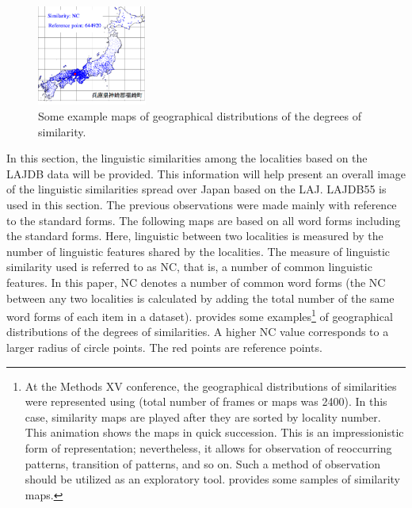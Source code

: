 \documentclass[output=paper]{LSP/langsci}
\begin{document}
\begin{figure}[b]
\includegraphics[width=0.32\textwidth]{illustrations/kuma_fig20-6}
\caption{Some example maps of geographical distributions of the degrees of similarity.}          
\label{fig:kuma:20}
\end{figure}
In this section, the linguistic similarities among the localities based on the LAJDB data will be provided. This information will help present an overall image of the linguistic similarities spread over Japan based on the LAJ. LAJDB55 is used in this section. The previous observations were made mainly with reference to the standard forms. The following maps are based on all word forms including the standard forms. Here, linguistic  between two localities is measured by the number of linguistic features shared by the localities. The measure of linguistic similarity used is referred to as NC, that is, a number of common linguistic features. In this paper, NC denotes a number of common word forms (the NC between any two localities is calculated by adding the total number of the same word forms of each item in a dataset).  provides some examples\footnote{At the Methods XV conference, the geographical distributions of similarities were represented using  (total number of frames or maps was 2400). In this case, similarity maps are played after they are sorted by locality number. This animation shows the maps in quick succession. This is an impressionistic form of representation; nevertheless, it allows for observation of reoccurring patterns, transition of patterns, and so on. Such a method of observation should be utilized as an exploratory tool.  provides some samples of similarity maps.} of geographical distributions of the degrees of similarities. A higher NC value corresponds to a larger radius of circle points. The red points are reference points.
\end{document}
